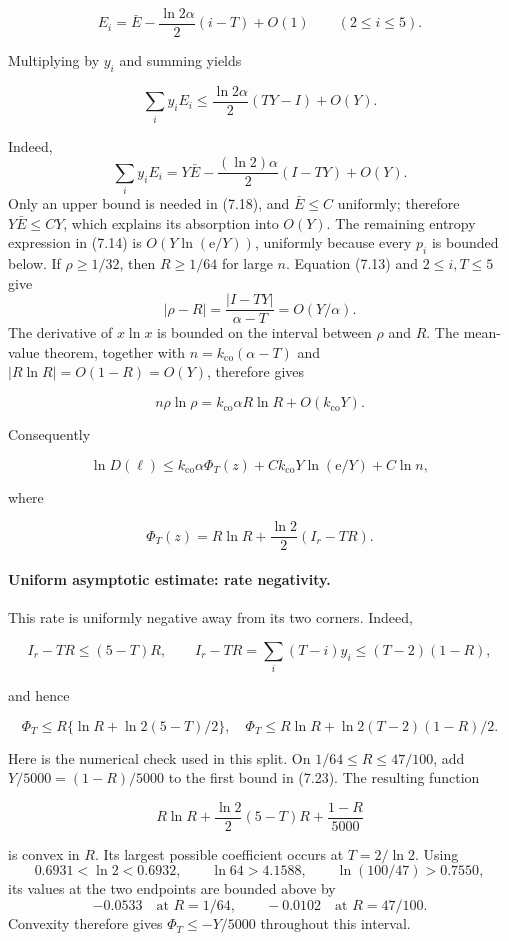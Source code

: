 \documentclass[11pt,reqno]{amsart}
\begin{document}
\[
 E_i=\bar E-\frac{{\ln 2}\alpha}{2}(i-T)+O(1)
 \qquad(2\le i\le5).
\]

Multiplying by \(y_i\) and summing yields

\[
 \sum_i y_iE_i\le\frac{{\ln 2}\alpha}{2}(TY-I)+O(Y).          \tag{7.18}
\]

Indeed,
\[
 \sum_i y_iE_i
 =Y\bar E-\frac{(\ln 2)\alpha}{2}(I-TY)+O(Y).
\]
Only an upper bound is needed in (7.18), and \(\bar E\le C\) uniformly;
therefore \(Y\bar E\le CY\), which explains its absorption into
\(O(Y)\).
The remaining entropy expression in (7.14) is \(O(Y \ln(\mathrm{e}/Y))\),
uniformly because every \(p_i\) is bounded below. If
\(\rho\ge 1/32\), then \(R\ge 1/64\) for
large \(n\). Equation (7.13) and \(2\le i,T\le5\) give
\[
 |\rho-R|
 =\frac{|I-TY|}{\alpha-T}=O(Y/\alpha).
\]
The derivative of \(x\ln x\) is bounded on the interval between
\(\rho\) and \(R\). The mean-value theorem, together with
\(n=k_{\mathrm{co}}(\alpha-T)\) and
\(|R\ln R|=O(1-R)=O(Y)\), therefore gives

\[
 n\rho\ln\rho=k_{\mathrm{co}}\alpha R\ln R+O(k_{\mathrm{co}}Y).           \tag{7.19}
\]

Consequently

\[
 \ln D(\ell)
 \le k_{\mathrm{co}}\alpha\Phi_T(z)
     +Ck_{\mathrm{co}}Y\ln(\mathrm{e}/Y)+C{\ln n},                       \tag{7.20}
\]

where

\[
 \Phi_T(z)=R\ln R+\frac {\ln 2}2(I_r-TR).                     \tag{7.21}
\]

\paragraph{Uniform asymptotic estimate: rate negativity.}
This rate is uniformly negative away from its two corners. Indeed,

\[
 I_r-TR\le(5-T)R,\qquad
 I_r-TR=\sum_i(T-i)y_i\le(T-2)(1-R),                    \tag{7.22}
\]

and hence

\[
 \Phi_T\le R\{\ln R+{\ln 2}(5-T)/2\},
 \quad
 \Phi_T\le R\ln R+{\ln 2}(T-2)(1-R)/2.                       \tag{7.23}
\]

Here is the numerical check used in this split.  On
\(1/64\le R\le47/100\), add \(Y/5000=(1-R)/5000\) to the first
bound in (7.23).  The resulting function

\[
 R\ln R+\frac{{\ln 2}}2(5-T)R+\frac{1-R}{5000}
\]

is convex in \(R\).  Its largest possible coefficient occurs at
\(T=2/{\ln 2}\). Using
\[
 0.6931<\ln 2<0.6932,\qquad
 \ln 64>4.1588,\qquad \ln(100/47)>0.7550,
\]
its values at the two endpoints are bounded above by
\[
 -0.0533\quad\text{at }R=1/64,\qquad
 -0.0102\quad\text{at }R=47/100.
\]
Convexity therefore gives \(\Phi_T\le-Y/5000\) throughout this interval.
\end{document}
